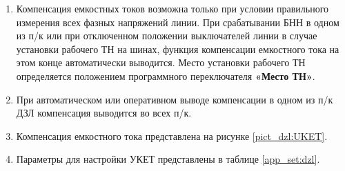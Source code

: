 \begin{enumerate}
\begin{enumerate}
\item Компенсация емкостных токов возможна только при условии правильного измерения всех фазных напряжений линии. При срабатывании БНН в одном из п/к или при отключенном положении выключателей линии в случае установки рабочего ТН на шинах, функция компенсации емкостного тока на этом конце автоматически выводится. Место установки рабочего ТН определяется положением программного переключателя \textbf{«Место ТН»}.

\item При автоматическом или оперативном выводе компенсации в одном из п/к ДЗЛ компенсация выводится во всех п/к.
\item Компенсация емкостного тока представлена на рисунке \ref{pict_dzl:UKET}.
\item Параметры для настройки УКЕТ представлены в таблице \ref{app_set:dzl}.
\end{enumerate}


\end{enumerate}
